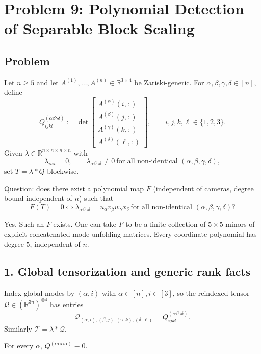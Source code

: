 \section{Problem 9: Polynomial Detection of Separable Block Scaling}\label{sec:q9}

\subsection*{Problem}
Let $n\ge 5$ and let $A^{(1)},\dots,A^{(n)}\in\mathbb R^{3\times 4}$ be Zariski-generic.
For $\alpha,\beta,\gamma,\delta\in[n]$, define
\[
Q^{(\alpha\beta\gamma\delta)}_{ijkl}
:=\det\!
\begin{bmatrix}
A^{(\alpha)}(i,:)\\
A^{(\beta)}(j,:)\\
A^{(\gamma)}(k,:)\\
A^{(\delta)}(\ell,:)
\end{bmatrix},
\qquad i,j,k,\ell\in\{1,2,3\}.
\]
Given $\lambda\in\mathbb R^{n\times n\times n\times n}$ with
\[
\lambda_{iiii}=0,\qquad \lambda_{\alpha\beta\gamma\delta}\neq 0\ \text{for all non-identical }(\alpha,\beta,\gamma,\delta),
\]
set $T=\lambda*Q$ blockwise.

Question: does there exist a polynomial map $F$ (independent of cameras, degree bound independent of $n$) such that
\[
F(T)=0
\iff
\lambda_{\alpha\beta\gamma\delta}=u_\alpha v_\beta w_\gamma x_\delta
\ \text{for all non-identical }(\alpha,\beta,\gamma,\delta)?
\]

\begin{theorem}\label{thm:q9-main}
Yes. Such an $F$ exists. One can take $F$ to be a finite collection of $5\times 5$ minors of explicit concatenated mode-unfolding matrices. Every coordinate polynomial has degree $5$, independent of $n$.
\end{theorem}

\subsection*{1. Global tensorization and generic rank facts}

Index global modes by $(\alpha,i)$ with $\alpha\in[n], i\in[3]$, so the reindexed tensor $\mathcal Q\in(\mathbb R^{3n})^{\otimes 4}$ has entries
\[
\mathcal Q_{(\alpha,i),(\beta,j),(\gamma,k),(\delta,\ell)}
=Q^{(\alpha\beta\gamma\delta)}_{ijkl}.
\]
Similarly $\mathcal T=\lambda*\mathcal Q$.

\begin{lemma}
For every $\alpha$, $Q^{(\alpha\alpha\alpha\alpha)}\equiv 0$.
\end{lemma}

